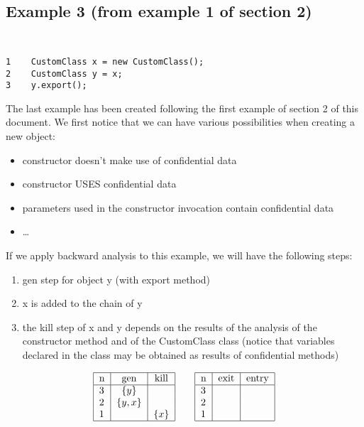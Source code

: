 \documentclass[letterpaper,twocolumn,10pt]{article}
\begin{document}
\subsection{Example 3 (from example 1 of section 2)}
{\tt \small
\begin{verbatim}
1    CustomClass x = new CustomClass();
2    CustomClass y = x;
3    y.export();
\end{verbatim}
}

The last example has been created following the first example of section 2 of this document. We first notice that we can have various possibilities when creating a new object:\\

\begin{itemize}
  \item constructor doesn't make use of confidential data
  \item constructor USES confidential data
  \item parameters used in the constructor invocation contain confidential data
  \item \ldots
\end{itemize}

If we apply backward analysis to this example, we will have the following steps:

\begin{enumerate}
\item gen step for object y (with export method)
\item x is added to the chain of y
\item the kill step of x and y depends on the results of the analysis of the constructor method and of the CustomClass class (notice that variables declared in the class may be obtained as results of confidential methods)
\end{enumerate}

\begin{align*}
\begin{tabular}{|l|*{2}{c|}}
  \hline
  n & gen & kill  \\
  \hline 
  3 & $\{y \}$ & \\ 
  2 & $\{y, x\}$ & \\
  1 &  & $\{x\}$ \\
  \hline
\end{tabular}
\qquad
\begin{tabular}{|l|*{2}{c|}}
  \hline
  n & exit & entry  \\
  \hline 
  3 &  & \\ 
  2 &  &\\
  1 &  & \\
  \hline
\end{tabular}
\end{align*}
\end{document}
